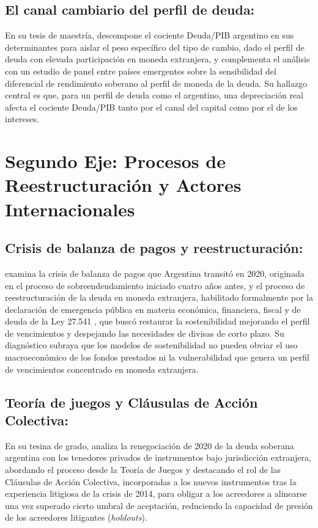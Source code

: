 \subsection{El canal cambiario del perfil de deuda: \texorpdfstring{\textcite{sanches2019}}{Sanches (2019)}}
En su tesis de maestría, \textcite{sanches2019} descompone el cociente Deuda/PIB argentino en sus determinantes para aislar el peso específico del tipo de cambio, dado el perfil de deuda con elevada participación en moneda extranjera, y complementa el análisis con un estudio de panel entre países emergentes sobre la sensibilidad del diferencial de rendimiento soberano al perfil de moneda de la deuda. Su hallazgo central es que, para un perfil de deuda como el argentino, una depreciación real afecta el cociente Deuda/PIB tanto por el canal del capital como por el de los intereses.

\section{Segundo Eje: Procesos de Reestructuración y Actores Internacionales}

\subsection{Crisis de balanza de pagos y reestructuración: \texorpdfstring{\textcite{aruguete2021}}{Aruguete (2021)}}
\citet{aruguete2021} examina la crisis de balanza de pagos que Argentina transitó en 2020, originada en el proceso de sobreendeudamiento iniciado cuatro años antes, y el proceso de reestructuración de la deuda en moneda extranjera, habilitado formalmente por la declaración de emergencia pública en materia económica, financiera, fiscal y de deuda de la Ley 27.541 \citep{ley27541}, que buscó restaurar la sostenibilidad mejorando el perfil de vencimientos y despejando las necesidades de divisas de corto plazo. Su diagnóstico subraya que los modelos de sostenibilidad no pueden obviar el uso macroeconómico de los fondos prestados ni la vulnerabilidad que genera un perfil de vencimientos concentrado en moneda extranjera.

\subsection{Teoría de juegos y Cláusulas de Acción Colectiva: \texorpdfstring{\textcite{roldan2021}}{Roldán (2021)}}
En su tesina de grado, \citet{roldan2021} analiza la renegociación de 2020 de la deuda soberana argentina con los tenedores privados de instrumentos bajo jurisdicción extranjera, abordando el proceso desde la Teoría de Juegos y destacando el rol de las Cláusulas de Acción Colectiva, incorporadas a los nuevos instrumentos tras la experiencia litigiosa de la crisis de 2014, para obligar a los acreedores a alinearse una vez superado cierto umbral de aceptación, reduciendo la capacidad de presión de los acreedores litigantes (\textit{holdouts}).

